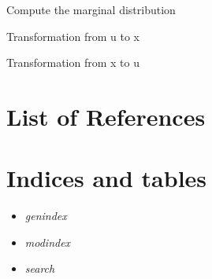 \documentclass[letterpaper,10pt,english]{sphinxmanual}
\begin{document}
\begin{fulllineitems}
\begin{fulllineitems}
\end{fulllineitems}



\begin{fulllineitems}
Compute the marginal distribution

\end{fulllineitems}



\begin{fulllineitems}
Transformation from u to x

\end{fulllineitems}



\begin{fulllineitems}
Transformation from x to u

\end{fulllineitems}


\end{fulllineitems}



\chapter{List of References}
\label{references:list-of-references}\label{references::doc}

\chapter{Indices and tables}
\label{index:indices-and-tables}\begin{itemize}
\item {} 
\emph{genindex}

\item {} 
\emph{modindex}

\item {} 
\emph{search}

\end{itemize}
\end{document}
